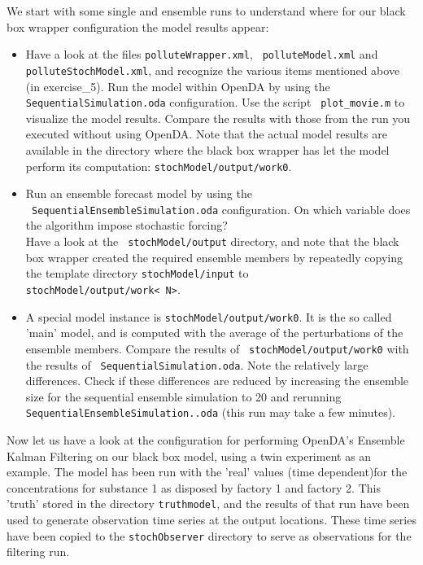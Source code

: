 \documentclass[a4paper,10pt]{article}
\begin{document}
We start with some single and ensemble runs to understand where for our black
box wrapper configuration the model results appear:
\begin{itemize}

 \item Have a look at the files {\tt polluteWrapper.xml}, {\tt
   polluteModel.xml} and {\tt polluteStochModel.xml}, and recognize the various
   items mentioned above (in exercise\_5). Run the model within OpenDA by using
   the \\{\tt SequentialSimulation.oda} configuration. Use the script {\tt
     plot\_movie.m} to visualize the model results. Compare the results with
   those from the run you executed without using OpenDA. Note that the actual
   model results are available in the directory where the black box wrapper has
   let the model perform its computation: {\tt stochModel/output/work0}.
 \item Run an ensemble forecast model by using the \\{\tt
   SequentialEnsembleSimulation.oda} configuration. On which variable does the
   algorithm impose stochastic forcing?\\ Have a look at the {\tt
     stochModel/output} directory, and note that the black box wrapper created
   the required ensemble members by repeatedly copying the template directory
   {\tt stochModel/input} to\\ {\tt stochModel/output/work\textless
     N\textgreater}.
 \item A special model instance is {\tt stochModel/output/work0}. It is the so
   called 'main' model, and is computed with the average of the perturbations
   of the ensemble members. Compare the results of {\tt
     stochModel/output/work0} with the results of {\tt
     SequentialSimulation.oda}. Note the relatively large differences. Check if
   these differences are reduced by increasing the ensemble size for the
   sequential ensemble simulation to 20 and rerunning {\tt
     SequentialEnsembleSimulation..oda} (this run may take a few minutes).
\end{itemize}

Now let us have a look at the configuration for performing OpenDA's Ensemble
Kalman Filtering on our black box model, using a twin experiment as an example.
The model has been run with the 'real' values (time dependent)for the
concentrations for substance 1 as disposed by factory 1 and factory 2. This
'truth' stored in the directory {\tt truthmodel}, and the results of that run
have been used to generate observation time series at the output locations.
These time series have been copied to the {\tt stochObserver} directory to
serve as observations for the filtering run.
\end{document}
